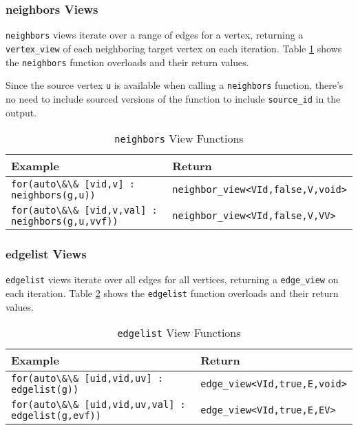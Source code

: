 \documentclass[10pt,onecolumn]{article}
\newcommand{\tcode}[1]{\lstinline[breaklines=true]{#1}}
\begin{document}
\subsubsection{neighbors Views}
\tcode{neighbors} views iterate over a range of edges for a vertex, returning a \tcode{vertex_view} of each neighboring target vertex on each iteration. 
Table \ref{tab:neighbors} shows the \tcode{neighbors} function overloads and their return values. 

Since the source vertex \tcode{u} is available when calling a \tcode{neighbors} function, there's no need to include sourced versions of the function to include \tcode{source_id} in the output.

\begin{table}[h!]
\begin{center}
{\begin{tabular}{l l}
\hline
    \textbf{Example} & \textbf{Return} \\
\hline
    \tcode{for(auto\&\& [vid,v] : neighbors(g,u))} & \tcode{neighbor_view<VId,false,V,void>} \\
    \tcode{for(auto\&\& [vid,v,val] : neighbors(g,u,vvf))} & \tcode{neighbor_view<VId,false,V,VV>} \\
\hline
\end{tabular}}
\caption{\tcode{neighbors} View Functions}
\label{tab:neighbors}
\end{center}
\end{table}

\subsubsection{edgelist Views}
\tcode{edgelist} views iterate over all edges for all vertices, returning a \tcode{edge_view} on each iteration. 
Table \ref{tab:edgelist} shows the \tcode{edgelist} function overloads and their return values. 

\begin{table}[h!]
\begin{center}
{\begin{tabular}{l l}
\hline
    \textbf{Example} & \textbf{Return} \\
\hline
    \tcode{for(auto\&\& [uid,vid,uv] : edgelist(g))} & \tcode{edge_view<VId,true,E,void>} \\
    \tcode{for(auto\&\& [uid,vid,uv,val] : edgelist(g,evf))} & \tcode{edge_view<VId,true,E,EV>} \\
\hline
\end{tabular}}
\caption{\tcode{edgelist} View Functions}
\label{tab:edgelist}
\end{center}
\end{table}
\end{document}

